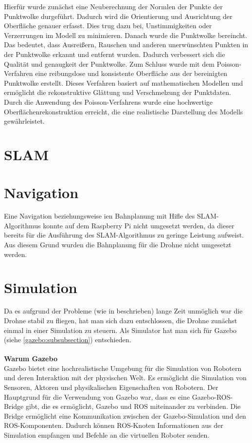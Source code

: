    Hierfür wurde zunächst eine Neuberechnung der Normlen der Punkte der Punktwolke durgeführt. Dadurch wird die Orientierung und Ausrichtung der Oberfläche genauer erfasst. Dies trug dazu bei, Unstimmigkeiten oder Verzerrungen im Modell zu minimieren. Danach wurde die Punktwolke bereincht. Das bedeutet, dass Ausreißern, Rauschen und anderen unerwünschten Punkten in der Punktwolke erkannt und entfernt wurden. Dadurch verbessert sich die Qualität und genaugkeit der Punktwolke. Zum Schluss wurde mit dem Poisson-Verfahren eine reibungslose und konsistente Oberfläche aus der bereinigten Punktwolke erstellt. Dieses Verfahren basiert auf mathematischen Modellen und ermöglicht die rekonstruktive Glättung und Verschmelzung der Punktdaten. Durch die Anwendung des Poisson-Verfahrens wurde eine hochwertige Oberflächenrekonstruktion erreicht, die eine realistische Darstellung des Modells gewährleistet.

\section{SLAM} \label{slam:section}
\section{Navigation} \label{navigation:section} 
Eine Navigation beziehungsweise ien Bahnplanung mit Hifle des \ac{SLAM}-Algorithmus konnte auf dem Raspberry Pi nicht umgesetzt werden, da dieser bereits für die Ausführung des \ac{SLAM}-Algorithmus zu geringe Leistung aufweist. Aus diesem Grund wurden die Bahnplanung für die Drohne nicht umgesetzt werden.



\section{Simulation} \label{simulation:section}
Da es aufgrund der Probleme (wie in  beschrieben) lange Zeit unmöglich war die Drohne stabil zu fliegen, hat man  sich dazu entschlossen, die Drohne zunächst einmal in einer Simulation zu steuern. Als Simulator hat man sich für Gazebo (siehe \ref{gazebo:subsubsection}) entschieden. \\
\\
\textbf{Warum Gazebo} \\
Gazebo bietet eine hochrealistische Umgebung für die Simulation von Robotern und deren Interaktion mit der physischen Welt. Es ermöglicht die Simulation von Sensoren, Aktoren und physikalischen Eigenschaften von Robotern. Der Hauptgrund für die Verwendung von Gazebo war, dass es eine Gazebo-ROS-Bridge gibt, die es ermöglicht, Gazebo und ROS miteinander zu verbinden. Die Bridge ermöglicht eine Kommunikation zwischen der Gazebo-Simulation und den ROS-Komponenten. Dadurch können ROS-Knoten Informationen aus der Simulation empfangen und Befehle an die virtuellen Roboter senden. \\

